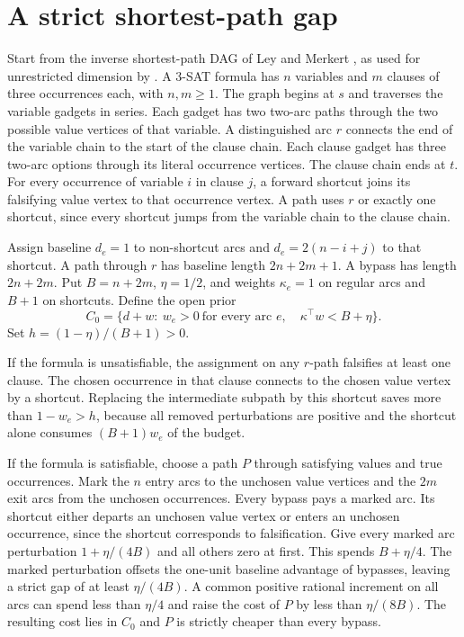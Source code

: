 \documentclass[11pt,a4paper]{amsart}
\begin{document}
\section{A strict shortest-path gap}
Start from the inverse shortest-path DAG of Ley and Merkert \cite[Theorem 3.1]{ley}, as used for unrestricted dimension by \cite[Appendix A.1]{ye}. A 3-SAT formula has $n$ variables and $m$ clauses of three occurrences each, with $n,m\geq1$. The graph begins at $s$ and traverses the variable gadgets in series. Each gadget has two two-arc paths through the two possible value vertices of that variable. A distinguished arc $r$ connects the end of the variable chain to the start of the clause chain. Each clause gadget has three two-arc options through its literal occurrence vertices. The clause chain ends at $t$. For every occurrence of variable $i$ in clause $j$, a forward shortcut joins its falsifying value vertex to that occurrence vertex. A path uses $r$ or exactly one shortcut, since every shortcut jumps from the variable chain to the clause chain.

Assign baseline $d_e=1$ to non-shortcut arcs and $d_e=2(n-i+j)$ to that shortcut. A path through $r$ has baseline length $2n+2m+1$. A bypass has length $2n+2m$. Put $B=n+2m$, $\eta=1/2$, and weights $\kappa_e=1$ on regular arcs and $B+1$ on shortcuts. Define the open prior
\[
 C_0=\{d+w:\ w_e>0\ \text{for every arc }e,\quad \kappa^\top w<B+\eta\}.
\]
Set $h=(1-\eta)/(B+1)>0$.

If the formula is unsatisfiable, the assignment on any $r$-path falsifies at least one clause. The chosen occurrence in that clause connects to the chosen value vertex by a shortcut. Replacing the intermediate subpath by this shortcut saves more than $1-w_e>h$, because all removed perturbations are positive and the shortcut alone consumes $(B+1)w_e$ of the budget.

If the formula is satisfiable, choose a path $P$ through satisfying values and true occurrences. Mark the $n$ entry arcs to the unchosen value vertices and the $2m$ exit arcs from the unchosen occurrences. Every bypass pays a marked arc. Its shortcut either departs an unchosen value vertex or enters an unchosen occurrence, since the shortcut corresponds to falsification. Give every marked arc perturbation $1+\eta/(4B)$ and all others zero at first. This spends $B+\eta/4$. The marked perturbation offsets the one-unit baseline advantage of bypasses, leaving a strict gap of at least $\eta/(4B)$. A common positive rational increment on all arcs can spend less than $\eta/4$ and raise the cost of $P$ by less than $\eta/(8B)$. The resulting cost lies in $C_0$ and $P$ is strictly cheaper than every bypass.
\end{document}
